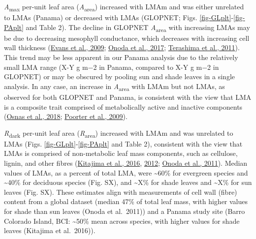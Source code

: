 \documentclass[
  12pt,
  a4paper,
,tablecaptionabove
]{scrartcl}
\begin{document}
\emph{A}\textsubscript{max} per-unit leaf area
(\emph{A}\textsubscript{area}) increased with LMAm and was either
unrelated to LMAs (Panama) or decreased with LMAs (GLOPNET; Figs.
\ref{fig-GLplt}-\ref{fig-PAplt} and Table 2). The decline in GLOPNET
\emph{A}\textsubscript{area} with increasing LMAs may be due to
decreasing mesophyll conductance, which decreases with increasing cell
wall thickness (\protect\hyperlink{ref-Evans2009}{Evans et al., 2009};
\protect\hyperlink{ref-Onoda2017}{Onoda et al., 2017};
\protect\hyperlink{ref-Terashima2011}{Terashima et al., 2011}). This
trend may be less apparent in our Panama analysis due to the relatively
small LMA range (X-Y g m−2 in Panama, compared to X-Y g m−2 in GLOPNET)
or may be obscured by pooling sun and shade leaves in a single analysis.
In any case, an increase in \emph{A}\textsubscript{area} with LMAm but
not LMAs, as observed for both GLOPNET and Panama, is consistent with
the view that LMA is a composite trait comprised of metabolically active
and inactive components (\protect\hyperlink{ref-Osnas2018}{Osnas et al.,
2018}; \protect\hyperlink{ref-Poorter2009}{Poorter et al., 2009}).

\emph{R}\textsubscript{dark} per-unit leaf area
(\emph{R}\textsubscript{area}) increased with LMAm and was unrelated to
LMAs (Figs. \ref{fig-GLplt}-\ref{fig-PAplt} and Table 2), consistent
with the view that LMAs is comprised of non-metabolic leaf mass
components, such as cellulose, lignin, and other fibres
(\protect\hyperlink{ref-Kitajima2016}{Kitajima et al., 2016},
\protect\hyperlink{ref-Kitajima2012}{2012};
\protect\hyperlink{ref-Onoda2011}{Onoda et al., 2011}). Median values of
LMAs, as a percent of total LMA, were \textasciitilde60\% for evergreen
species and \textasciitilde40\% for deciduous species (Fig. SX), and
\textasciitilde X\% for shade leaves and \textasciitilde X\% for sun
leaves (Fig. SX). These estimates align with measurements of cell wall
(fibre) content from a global dataset (median 47\% of total leaf mass,
with higher values for shade than sun leaves (Onoda et al.~2011)) and a
Panama study site (Barro Colorado Island, BCI: \textasciitilde50\% mean
across species, with higher values for shade leaves (Kitajima et
al.~2016)).
\end{document}
